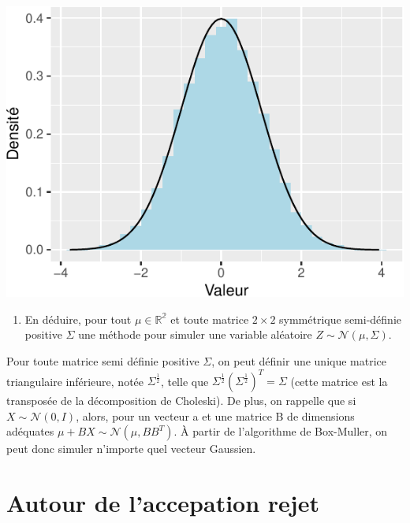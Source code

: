 \documentclass[]{article}
\providecommand{\tightlist}{%
  \setlength{\itemsep}{0pt}\setlength{\parskip}{0pt}}
\newenvironment{Correction}%
  { \vspace{\baselineskip}\begin{mdframed}[backgroundcolor=my_green]}%
  {\end{mdframed}}
\begin{document}
\begin{center}\includegraphics{correction_simulation_variables_aleatoires_files/figure-latex/plot_box_muller-1} \end{center}

\begin{enumerate}
\def\labelenumi{\arabic{enumi}.}
\setcounter{enumi}{2}
\tightlist
\item
  En déduire, pour tout \(\mu \in \mathbb{R^2}\) et toute matrice
  \(2\times 2\) symmétrique semi-définie positive \(\Sigma\) une méthode
  pour simuler une variable aléatoire
  \(Z\sim \mathcal{N}(\mu, \Sigma)\).
\end{enumerate}

\begin{Correction}
Pour toute matrice semi définie positive $\Sigma$, on peut définir une unique matrice triangulaire inférieure, notée $\Sigma^{\frac{1}{2}}$, telle que $\Sigma^{\frac{1}{2}}(\Sigma^{\frac{1}{2}})^T = \Sigma$ (cette matrice est la transposée de la décomposition de Choleski).
De plus, on rappelle que si $X \sim \mathcal{N}(0, I)$, alors, pour un vecteur a et une matrice B de dimensions adéquates $\mu + BX \sim \mathcal{N}(\mu, BB^T)$. À partir de l'algorithme de Box-Muller, on peut donc simuler n'importe quel vecteur Gaussien.
\end{Correction}

\hypertarget{autour-de-laccepation-rejet}{%
\section{Autour de l'accepation
rejet}\label{autour-de-laccepation-rejet}}
\end{document}
